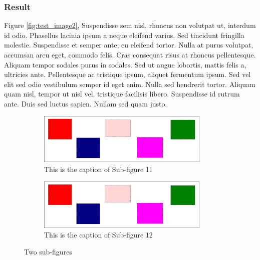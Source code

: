 \subsubsection{Result}
Figure \ref{fig:test_image2}, Suspendisse sem nisl, rhoncus non volutpat ut,
interdum id odio. Phasellus lacinia ipsum a neque eleifend varius. Sed
tincidunt fringilla molestie.  Suspendisse et semper ante, eu eleifend tortor.
Nulla at purus volutpat, accumsan arcu eget, commodo felis. Cras consequat
risus at rhoncus pellentesque. Aliquam tempor sodales purus in sodales. Sed ut
augue lobortis, mattis felis a, ultricies ante. Pellentesque ac tristique
ipsum, aliquet fermentum ipsum. Sed vel elit sed odio vestibulum semper id eget
enim. Nulla sed hendrerit tortor. Aliquam quam nisl, tempor ut nisl vel,
tristique facilisis libero. Suspendisse id rutrum ante. Duis sed luctus sapien.
Nullam sed quam justo.
\begin{figure}[h]
    \begin{subfigure}[b]{0.5\linewidth}
        \centering
            \includegraphics[width=0.9\textwidth]{figures/test_image}
            \caption{This is the caption of Sub-figure 11}
            \label{fig:subfig11}
            \end{subfigure}%
        \begin{subfigure}[b]{.5\linewidth}
            \centering
            \includegraphics[width=0.9\textwidth]{figures/test_image}
            \caption{This is the caption of Sub-figure 12}
            \label{fig:subfig12}
        \end{subfigure}
    \caption{Two sub-figures}
\label{fig:sub-figures2}
\end{figure}

